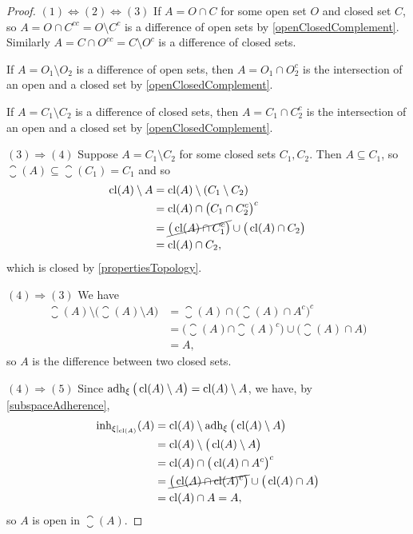 \begin{proof}
$(1) \Leftrightarrow (2) \Leftrightarrow (3)$ If $A = O\cap C$ for some open set $O$ and closed set $C$, so $A= O\cap C^{cc} = O\setminus C^c$ is a difference of open sets by \ref{openClosedComplement}. Similarly $A = C\cap O^{cc} = C\setminus O^c$ is a difference of closed sets.

If $A = O_1\setminus O_2$ is a difference of open sets, then $A = O_1 \cap O_2^c$ is the intersection of an open and a closed set by \ref{openClosedComplement}.

If $A = C_1\setminus C_2$ is a difference of closed sets, then $A = C_1 \cap C_2^c$ is the intersection of an open and a closed set by \ref{openClosedComplement}.

$(3) \Rightarrow (4)$ Suppose $A = C_1 \setminus C_2$ for some closed sets $C_1,C_2$. Then $A \subseteq C_1$, so $\closure(A) \subseteq \closure(C_1) = C_1$ and so
\begin{align*}
\operatorname{cl}(A)\setminus A &= \operatorname{cl}(A)\setminus (C_1\setminus C_2) \\
&= \operatorname{cl}(A)\cap \big(C_1\cap C_2^c\big)^c \\
&= \cancel{\big(\operatorname{cl}(A)\cap C_1^c\big)} \cup \big(\operatorname{cl}(A)\cap C_2\big) \\
&= \operatorname{cl}(A) \cap C_2,
\end{align*}
which is closed by \ref{propertiesTopology}.

$(4) \Rightarrow (3)$ We have
\begin{align*}
\closure(A)\setminus \big(\closure(A)\setminus A\big) &= \closure(A)\cap \big(\closure(A)\cap A^c\big)^c \\
&= \big(\closure(A)\cap \closure(A)^c\big) \cup \big(\closure(A)\cap A\big) \\
&= A,
\end{align*}
so $A$ is the difference between two closed sets.

$(4) \Rightarrow (5)$ Since $\operatorname{adh}_\xi\big(\operatorname{cl}(A)\setminus A\big) = \operatorname{cl}(A)\setminus A$, we have, by \ref{subspaceAdherence},
\begin{align*}
\operatorname{inh}_{\xi|_{\operatorname{cl}(A)}}(A) &= \operatorname{cl}(A)\setminus \operatorname{adh}_\xi\big(\operatorname{cl}(A)\setminus A\big) \\
&= \operatorname{cl}(A)\setminus \big(\operatorname{cl}(A)\setminus A\big) \\
&= \operatorname{cl}(A)\cap \big(\operatorname{cl}(A)\cap A^c\big)^c \\
&= \cancel{\big(\operatorname{cl}(A)\cap \operatorname{cl}(A)^c\big)} \cup \big(\operatorname{cl}(A)\cap A\big) \\
&= \operatorname{cl}(A)\cap A = A,
\end{align*}
so $A$ is open in $\closure(A)$.


\end{proof}
